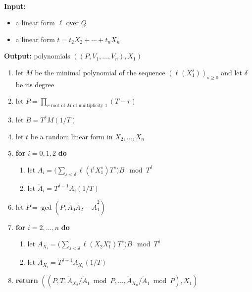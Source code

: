 \documentclass[12pt]{article}
\begin{document}
\begin{algorithm}[H]
 \caption{$\mathsf{ParametrizationX}_1(\ell,t)$}
~\\
 {\bf Input:} \vspace{-0.5em}
 \begin{itemize}\setlength\itemsep{0em}
 \item a linear form $\ell$ over $Q$
 \item a linear form $t=t_2 X_2 + \cdots + t_n X_n$
 \end{itemize}
 {\bf Output:} polynomials $((P,V_1,\dots,V_n),X_1)$
 \begin{enumerate}\setlength\itemsep{0em}
 \item let $M$ be the minimal polynomial of the sequence $(\ell(X_1^s))_{s \ge 0}$ and let $\delta$ be its degree
 \item let $P = \prod_{r \text{~root of $M$ of multiplicity 1}}(T-r)$
 \item let $B=T^\delta M(1/T)$
 \item let $t$ be a random linear form in $X_2,\dots,X_n$
 \item \textbf{for} $i=0,1,2$ \textbf{do}
   \begin{enumerate}
   \item let $A_i = \big (\sum_{s < \delta} \ell(t^i X_1^s)T^s\big )B \mod T^{\delta}$
   \item let $\tilde A_i = T^{\delta -1}A_i(1/T)$
   \end{enumerate}
 \item\label{step:updateP} let $P = \gcd(P, \tilde A_0 \tilde A_2-\tilde A_1^2)$
 \item \textbf{for} $i=2,\dots,n$ \textbf{do}
   \begin{enumerate}
   \item let $A_{X_i} = \big (\sum_{s < \delta} \ell(X_2 X_1^s)T^s\big)B \mod T^{\delta}$ 
   \item let $\tilde A_{X_i} = T^{\delta -1}A_{X_i}(1/T)$
   \end{enumerate}
 \item \textbf{return} $((P,T,\tilde A_{X_2}/\tilde A_1 \bmod P, \dots,\tilde A_{X_n}/\tilde A_{1} \bmod P),X_1)$
 \end{enumerate}
\label{algo:para}
\end{algorithm}
\end{document}
